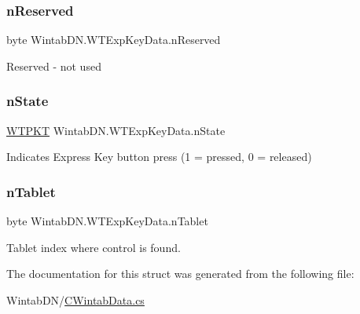 \subsubsection{\texorpdfstring{n\+Reserved}{nReserved}}
{\footnotesize\ttfamily byte Wintab\+D\+N.\+W\+T\+Exp\+Key\+Data.\+n\+Reserved}



Reserved -\/ not used 

\mbox{\label{struct_wintab_d_n_1_1_w_t_exp_key_data_ab9eb8c83e095d21a6cdc895ddd05a05b}} 
\subsubsection{\texorpdfstring{n\+State}{nState}}
{\footnotesize\ttfamily \mbox{\hyperlink{class_wintab_d_n_1_1_w_t_p_k_t}{W\+T\+P\+KT}} Wintab\+D\+N.\+W\+T\+Exp\+Key\+Data.\+n\+State}



Indicates Express Key button press (1 = pressed, 0 = released) 

\mbox{\label{struct_wintab_d_n_1_1_w_t_exp_key_data_a0d27feb54966805c3110795c66be049b}} 
\subsubsection{\texorpdfstring{n\+Tablet}{nTablet}}
{\footnotesize\ttfamily byte Wintab\+D\+N.\+W\+T\+Exp\+Key\+Data.\+n\+Tablet}



Tablet index where control is found. 



The documentation for this struct was generated from the following file\+:\begin{DoxyCompactItemize}
\item 
Wintab\+D\+N/\mbox{\hyperlink{_c_wintab_data_8cs}{C\+Wintab\+Data.\+cs}}\end{DoxyCompactItemize}
